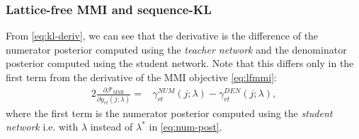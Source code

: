 \documentclass{article}
\newcommand{\oOr}[1]{\mathbf{O}_{#1}}
\newcommand{\yr}[1]{y_{#1}}
\newcommand{\pr}{{P}}
\newcommand{\lat}{\mathcal{L}}
\newcommand{\DenG}{\mathcal{G}_\text{DEN}}
\newcommand{\NumG}{\mathcal{G}_\text{NUM}}
\newcommand{\NumPost}[1]{\gamma_{rt}^{NUM}(j;#1)}
\newcommand{\DenPost}[1]{\gamma_{rt}^{DEN}(j;#1)}
\newcommand{\Fkl}{\mathcal{F}_\text{KL}}
\newcommand{\Fmmi}{\mathcal{F}_\text{MMI}}
\begin{document}

\subsubsection{Lattice-free MMI and sequence-KL}
\label{sec:combine-mmi-kl}

From \eqref{eq:kl-deriv}, we can see that the derivative is the
difference of the numerator posterior computed using the {\em teacher network} 
and the denominator posterior computed using the student network. Note that 
this differs only in the first term from the derivative of the MMI objective
\eqref{eq:lfmmi}:
\begin{alignat}{2}
 \frac{\partial\Fmmi}{\partial \yr{rt}(j;\lambda)} %
 =& \NumPost{\lambda} - \DenPost{\lambda}, \label{eq:mmi-deriv} 
\end{alignat}
where the first term is the numerator posterior computed using the {\em student
network} i.e. with $\lambda$ instead of $\lambda^*$ in \eqref{eq:num-post}. 
\end{document}
